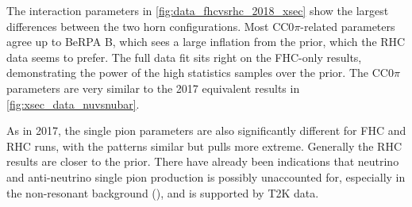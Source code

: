 The interaction parameters in \autoref{fig:data_fhcvsrhc_2018_xsec} show the largest differences between the two horn configurations. Most CC0$\pi$-related parameters agree up to BeRPA B, which sees a large inflation from the prior, which the RHC data seems to prefer. The full data fit sits right on the FHC-only results, demonstrating the power of the high statistics samples over the prior. The CC0$\pi$ parameters are very similar to the 2017 equivalent results in \autoref{fig:xsec_data_nuvsnubar}.

As in 2017, the single pion parameters are also significantly different for FHC and RHC runs, with the patterns similar but pulls more extreme. Generally the RHC results are closer to the prior. There have already been indications that neutrino and anti-neutrino single pion production is possibly unaccounted for, especially in the non-resonant background (), and is supported by T2K data.

